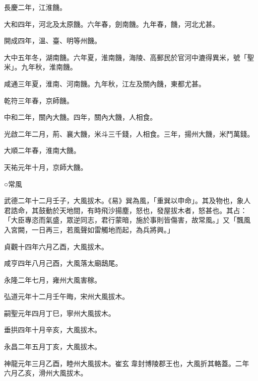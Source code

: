 \begin{pinyinscope}
 長慶二年，江淮饑。



 大和四年，河北及太原饑。六年春，劍南饑。九年春，饑，河北尤甚。



 開成四年，溫、臺、明等州饑。



 大中五年冬，湖南饑。六年夏，淮南饑，海陵、高郵民於官河中漉得異米，號「聖米」。九年秋，淮南饑。



 咸通三年夏，淮南、河南饑。九年秋，江左及關內饑，東都尤甚。



 乾符三年春，京師饑。



 中和二年，關內大饑。四年，關內大饑，人相食。



 光啟二年二月，荊、襄大饑，米斗三千錢，人相食。三年，揚州大饑，米鬥萬錢。



 大順二年春，淮南大饑。



 天祐元年十月，京師大饑。



 ○常風



 武德二年十二月壬子，大風拔木。《易》巽為風，「重巽以申命」。其及物也，象人君誥命，其鼓動於天地間，有時飛沙揚塵，怒也，發屋拔木者，怒甚也。其占：「大臣專恣而氣盛，眾逆同志，君行蒙暗，施於事則皆傷害，故常風。」又「飄風入宮闕，一日再三，若風聲如雷觸地而起，為兵將興。」



 貞觀十四年六月乙酉，大風拔木。



 咸亨四年八月己酉，大風落太廟鴟尾。



 永隆二年七月，雍州大風害稼。



 弘道元年十二月壬午晦，宋州大風拔木。



 嗣聖元年四月丁巳，寧州大風拔木。



 垂拱四年十月辛亥，大風拔木。



 永昌二年五月丁亥，大風拔木。



 神龍元年三月乙酉，睦州大風拔木。崔玄韋封博陵郡王也，大風折其輅蓋。二年六月乙亥，滑州大風拔木。




\end{pinyinscope}
